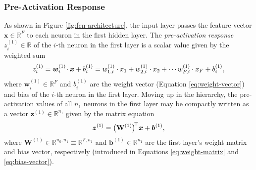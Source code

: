 \documentclass[11pt, a4paper]{article}
\renewcommand{\vec}[1]{\bm{#1}}
\newcommand{\mat}[1]{\mathbf{#1}}
\newcommand{\W}{\mat{W}}
\newcommand{\x}{\vec{x}}
\newcommand{\w}{\vec{w}}
\renewcommand{\b}{\vec{b}}
\newcommand{\z}{\vec{z}}
\begin{document}
\subsubsection{Pre-Activation Response}
As shown in Figure \ref{fig:fcn-architecture}, the input layer passes the feature vector $ \x \in \mathbb{R}^{F} $ to each neuron in the first hidden layer. The \textit{pre-activation response} $ z_{i}^{(1)} \in \mathbb{R} $ of the $ i $-th neuron in the first layer is a scalar value given by the weighted sum
    \begin{equation*}
        z_{i}^{(1)} = \w_{i}^{(1)} \mspace{-3mu} \cdot \x + b_{i}^{(1)}= w_{1, i}^{(1)} \cdot x_{1} + w_{2, i}^{(1)} \cdot x_{2} + \cdots w_{F, i}^{(1)} \cdot x_{F} + b_{i}^{(1)},
    \end{equation*}
    where $ \w_{i}^{(1)} \in \mathbb{R}^{F} $ and $ b_{i}^{(1)} $ are the weight vector (Equation \ref{eq:weight-vector}) and bias of the $ i $-th neuron in the first layer. Moving up in the hierarchy, the pre-activation values of all $ n_{1} $ neurons in the first layer may be compactly written as a vector $ \z^{(1)} \in \mathbb{R}^{n_{1}} $ given by the matrix equation
    \begin{equation*}
        \z^{(1)} = \big( \W^{(1)} \big)^{\mspace{-4mu}\top}\x + \b^{(1)},
    \end{equation*}
    where $ \W^{(1)} \in \mathbb{R}^{n_{0}, n_{1}} \equiv \mathbb{R}^{F, n_{1}} $ and $ \b^{(1)} \in \mathbb{R}^{n_{1}} $ are the first layer's weight matrix and bias vector, respectively (introduced in Equations \ref{eq:weight-matrix} and \ref{eq:bias-vector}).
\end{document}
